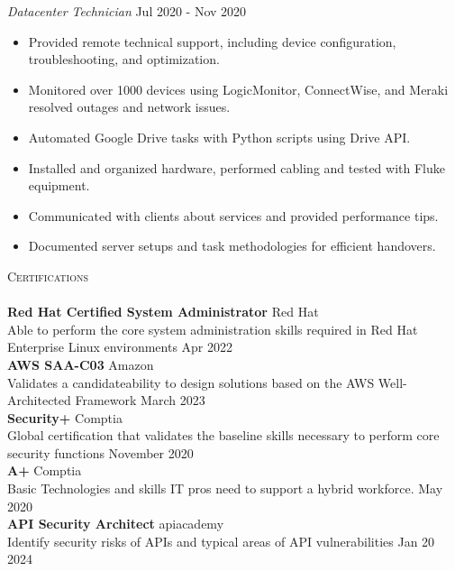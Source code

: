 \documentclass[a4paper]{article}
\newcommand{\lineunder} {
    \vspace*{-8pt} \\
    \hspace*{-18pt} \hrulefill \\
}
\newcommand{\header} [1] {
    {\hspace*{-18pt}\vspace*{6pt} \textsc{#1}}
    \vspace*{-6pt} \lineunder
}
\begin{document}
\textit{Datacenter Technician} \hfill Jul 2020 - Nov 2020\\
\vspace{-1mm}
\begin{itemize} \itemsep 1pt
	\item Provided remote technical support, including device configuration, troubleshooting, and optimization.
	\item Monitored over 1000 devices using LogicMonitor, ConnectWise, and Meraki resolved outages and network issues.
	\item Automated Google Drive tasks with Python scripts using Drive API.
	\item Installed and organized hardware, performed cabling and tested with Fluke equipment.
	\item Communicated with clients about services and provided performance tips.
	\item Documented server setups and task methodologies for efficient handovers.
\end{itemize}

\header{Certifications}
\textbf{Red Hat Certified System Administrator} \hfill Red Hat\\
Able to perform the core system administration skills required in Red Hat Enterprise Linux environments \hfill Apr 2022\\
\vspace*{2mm}
\textbf{AWS SAA-C03} \hfill Amazon\\
Validates a candidateability to design solutions based on the AWS Well-Architected Framework \hfill March 2023\\
\vspace*{2mm}
\textbf{Security+} \hfill Comptia\\
Global certification that validates the baseline skills necessary to perform core security functions \hfill November 2020\\
\vspace*{2mm}
\textbf{A+} \hfill Comptia\\
Basic Technologies and skills IT pros need to support a hybrid workforce. \hfill May 2020\\
\vspace*{2mm}
\textbf{API Security Architect} \hfill apiacademy\\
Identify security risks of API\textquotesingle{}s and typical areas of API vulnerabilities \hfill Jan 20 2024\\
\vspace*{2mm}
\end{document}
